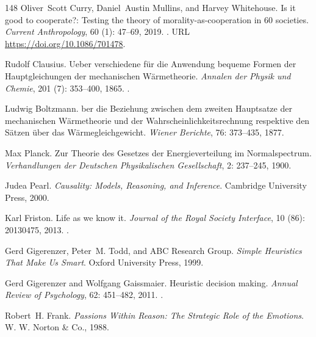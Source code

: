 \documentclass[11pt]{article}
\theoremstyle{plain}
\theoremstyle{definition}
\theoremstyle{remark}
\begin{document}
\begin{thebibliography}{148}
Oliver~Scott Curry, Daniel~Austin Mullins, and Harvey Whitehouse.
\newblock Is it good to cooperate?: Testing the theory of
  morality-as-cooperation in 60 societies.
\newblock \emph{Current Anthropology}, 60 (1): 47--69, 2019.
\newblock {}.
\newblock URL \url{https://doi.org/10.1086/701478}.

Rudolf Clausius.
\newblock Ueber verschiedene f{\"u}r die {Anwendung} bequeme {Formen} der
  {Hauptgleichungen} der mechanischen {W{\"a}rmetheorie}.
\newblock \emph{Annalen der Physik und Chemie}, 201 (7):
  353--400, 1865.
\newblock {}.

Ludwig Boltzmann.
ber die {Beziehung} zwischen dem zweiten {Hauptsatze} der
  mechanischen {W{\"a}rmetheorie} und der {Wahrscheinlichkeitsrechnung}
  respektive den {S{\"a}tzen} {\"u}ber das {W{\"a}rmegleichgewicht}.
\newblock \emph{Wiener Berichte}, 76: 373--435, 1877.

Max Planck.
\newblock Zur {Theorie} des {Gesetzes} der {Energieverteilung} im
  {Normalspectrum}.
\newblock \emph{Verhandlungen der Deutschen Physikalischen Gesellschaft},
  2: 237--245, 1900.

Judea Pearl.
\newblock \emph{Causality: Models, Reasoning, and Inference}.
\newblock Cambridge University Press, 2000.

Karl Friston.
\newblock Life as we know it.
\newblock \emph{Journal of the Royal Society Interface}, 10
  (86): 20130475, 2013.
\newblock {}.

Gerd Gigerenzer, Peter~M. Todd, and {ABC Research Group}.
\newblock \emph{Simple Heuristics That Make Us Smart}.
\newblock Oxford University Press, 1999.

Gerd Gigerenzer and Wolfgang Gaissmaier.
\newblock Heuristic decision making.
\newblock \emph{Annual Review of Psychology}, 62: 451--482, 2011.
\newblock {}.

Robert~H. Frank.
\newblock \emph{Passions Within Reason: The Strategic Role of the Emotions}.
\newblock W. W. Norton \& Co., 1988.


\end{thebibliography}
\end{document}
